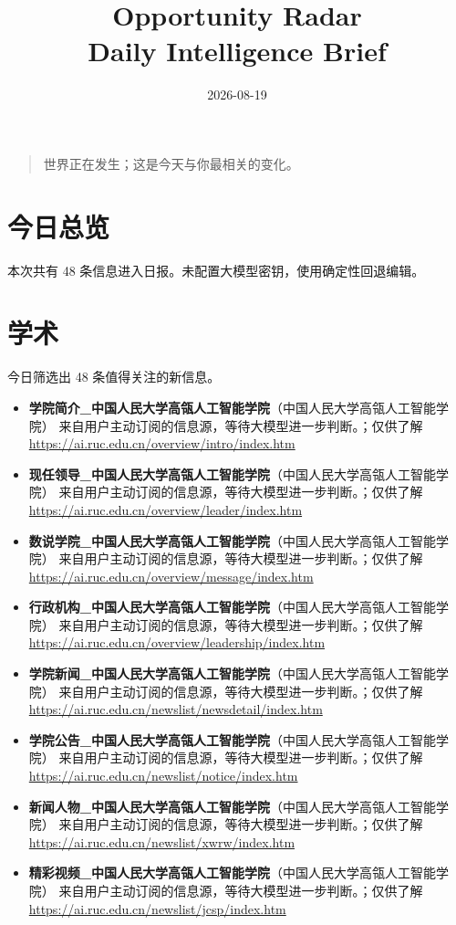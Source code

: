 \documentclass[11pt]{ctexart}
\title{Opportunity Radar\\Daily Intelligence Brief}
\date{2026-08-19}
\begin{document}
\maketitle
\begin{quote}\Large 世界正在发生；这是今天与你最相关的变化。\end{quote}
\section*{今日总览}
本次共有 48 条信息进入日报。未配置大模型密钥，使用确定性回退编辑。
\section*{学术}
今日筛选出 48 条值得关注的新信息。
\begin{itemize}
\item \textbf{学院简介\_中国人民大学高瓴人工智能学院}（中国人民大学高瓴人工智能学院） 来自用户主动订阅的信息源，等待大模型进一步判断。；仅供了解 \url{https://ai.ruc.edu.cn/overview/intro/index.htm}
\item \textbf{现任领导\_中国人民大学高瓴人工智能学院}（中国人民大学高瓴人工智能学院） 来自用户主动订阅的信息源，等待大模型进一步判断。；仅供了解 \url{https://ai.ruc.edu.cn/overview/leader/index.htm}
\item \textbf{数说学院\_中国人民大学高瓴人工智能学院}（中国人民大学高瓴人工智能学院） 来自用户主动订阅的信息源，等待大模型进一步判断。；仅供了解 \url{https://ai.ruc.edu.cn/overview/message/index.htm}
\item \textbf{行政机构\_中国人民大学高瓴人工智能学院}（中国人民大学高瓴人工智能学院） 来自用户主动订阅的信息源，等待大模型进一步判断。；仅供了解 \url{https://ai.ruc.edu.cn/overview/leadership/index.htm}
\item \textbf{学院新闻\_中国人民大学高瓴人工智能学院}（中国人民大学高瓴人工智能学院） 来自用户主动订阅的信息源，等待大模型进一步判断。；仅供了解 \url{https://ai.ruc.edu.cn/newslist/newsdetail/index.htm}
\item \textbf{学院公告\_中国人民大学高瓴人工智能学院}（中国人民大学高瓴人工智能学院） 来自用户主动订阅的信息源，等待大模型进一步判断。；仅供了解 \url{https://ai.ruc.edu.cn/newslist/notice/index.htm}
\item \textbf{新闻人物\_中国人民大学高瓴人工智能学院}（中国人民大学高瓴人工智能学院） 来自用户主动订阅的信息源，等待大模型进一步判断。；仅供了解 \url{https://ai.ruc.edu.cn/newslist/xwrw/index.htm}
\item \textbf{精彩视频\_中国人民大学高瓴人工智能学院}（中国人民大学高瓴人工智能学院） 来自用户主动订阅的信息源，等待大模型进一步判断。；仅供了解 \url{https://ai.ruc.edu.cn/newslist/jcsp/index.htm}
\end{itemize}
\end{document}
